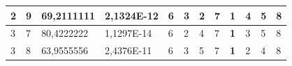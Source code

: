 \documentclass[conference]{IEEEtran}
\begin{document}
\begin{table}[]
\begin{tabular}{|llll|llllllll|}
\multicolumn{1}{|l|}{2}                                                     & \multicolumn{1}{l|}{9}                                                        & \multicolumn{1}{l|}{69,2111111}                                                   & 2,1324E-12                     & \multicolumn{1}{l|}{6}                                                  & \multicolumn{1}{l|}{3}                                                  & \multicolumn{1}{l|}{2}                                                  & \multicolumn{1}{l|}{7}                                                  & \multicolumn{1}{l|}{\textbf{1}}                                         & \multicolumn{1}{l|}{4}                                                  & \multicolumn{1}{l|}{5}                                                  & 8                          \\ \hline
\multicolumn{1}{|l|}{3}                                                     & \multicolumn{1}{l|}{7}                                                        & \multicolumn{1}{l|}{80,4222222}                                                   & 1,1297E-14                     & \multicolumn{1}{l|}{6}                                                  & \multicolumn{1}{l|}{2}                                                  & \multicolumn{1}{l|}{4}                                                  & \multicolumn{1}{l|}{7}                                                  & \multicolumn{1}{l|}{\textbf{1}}                                         & \multicolumn{1}{l|}{3}                                                  & \multicolumn{1}{l|}{5}                                                  & 8                          \\ \hline
\multicolumn{1}{|l|}{3}                                                     & \multicolumn{1}{l|}{8}                                                        & \multicolumn{1}{l|}{63,9555556}                                                   & 2,4376E-11                     & \multicolumn{1}{l|}{6}                                                  & \multicolumn{1}{l|}{3}                                                  & \multicolumn{1}{l|}{5}                                                  & \multicolumn{1}{l|}{7}                                                  & \multicolumn{1}{l|}{\textbf{1}}                                         & \multicolumn{1}{l|}{2}                                                  & \multicolumn{1}{l|}{4}                                                  & 8                          \\ \hline

\end{tabular}
\end{table}
\end{document}
